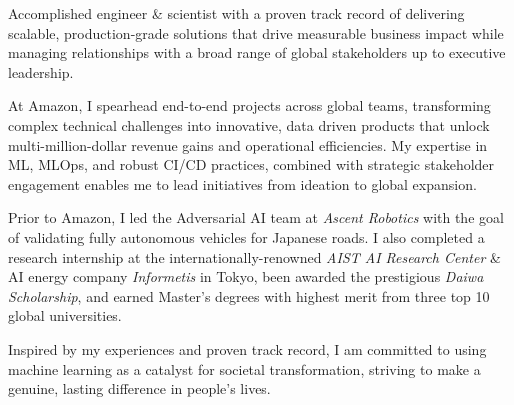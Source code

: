 

\begin{cvparagraph}

Accomplished engineer \& scientist with a proven track record of delivering scalable, production-grade solutions that drive measurable business impact while managing relationships with a broad range of global stakeholders up to executive leadership.

At Amazon, I spearhead end-to-end projects across global teams, transforming complex technical challenges into innovative, data driven products that unlock multi-million-dollar revenue gains and operational efficiencies. My expertise in ML, MLOps, and robust CI/CD practices, combined with strategic stakeholder engagement enables me to lead initiatives from ideation to global expansion. 

Prior to Amazon, I led the Adversarial AI team at \emph{Ascent Robotics} with the goal of validating fully autonomous vehicles for Japanese roads. I also completed a research internship at the internationally-renowned \emph{AIST AI Research Center} \& AI energy company \emph{Informetis} in Tokyo, been awarded the prestigious \emph{Daiwa Scholarship}, and earned Master's degrees with highest merit from three top 10 global universities. 

Inspired by my experiences and proven track record, I am committed to using machine learning as a catalyst for societal transformation, striving to make a genuine, lasting difference in people's lives.



\end{cvparagraph}